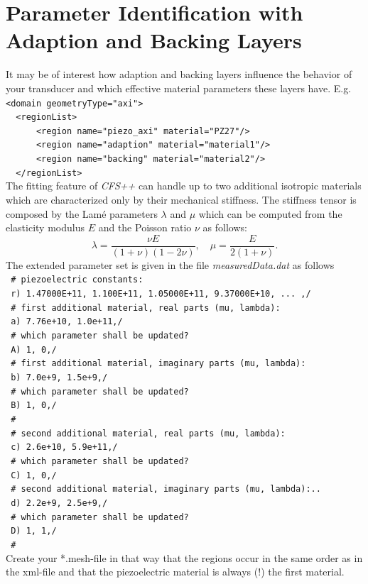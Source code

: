 \section{Parameter Identification with Adaption and Backing Layers}
It may be of interest how adaption and backing layers influence the behavior of your transducer and which effective material parameters these layers have. E.g. \\
\verb!<domain geometryType="axi">! \\
\verb!	<regionList>!\\
\verb!      <region name="piezo_axi" material="PZ27"/>! \\
\verb!      <region name="adaption" material="material1"/>! \\
\verb!      <region name="backing" material="material2"/>! \\
\verb!  </regionList> ! \\
The fitting feature of {\it CFS++} can handle up to two additional isotropic materials which are characterized only by their mechanical stiffness. The stiffness tensor is composed by the Lam\'{e} parameters $\lambda$ and $\mu$ which can be computed from the elasticity modulus $E$ and the Poisson ratio $\nu$ as follows:
$$\lambda = \frac{\nu E}{(1+\nu)(1-2\nu)},\quad \mu = \frac{E}{2(1+\nu)}.$$
 The extended parameter set is given in the file {\it measuredData.dat} as follows\\
\verb! # piezoelectric constants:! \\
\verb! r) 1.47000E+11, 1.100E+11, 1.05000E+11, 9.37000E+10, ... ,/ !\\
\verb! # first additional material, real parts (mu, lambda):!\\
\verb! a) 7.76e+10, 1.0e+11,/!\\
\verb! # which parameter shall be updated?!\\
\verb! A) 1, 0,/ !\\
\verb! # first additional material, imaginary parts (mu, lambda):!\\
\verb! b) 7.0e+9, 1.5e+9,/!\\
\verb! # which parameter shall be updated?!\\
\verb! B) 1, 0,/ !\\
\verb! #!\\
\verb! # second additional material, real parts (mu, lambda):!\\
\verb! c) 2.6e+10, 5.9e+11,/!\\
\verb! # which parameter shall be updated?!\\
\verb! C) 1, 0,/ !\\
\verb! # second additional material, imaginary parts (mu, lambda):..!\\
\verb! d) 2.2e+9, 2.5e+9,/!\\
\verb! # which parameter shall be updated?! \\
\verb! D) 1, 1,/ !\\
\verb! #!\\

\noindent Create your *.mesh-file in that way that the regions occur in the same order as in the xml-file and that the piezoelectric material is always (!) the first material.



